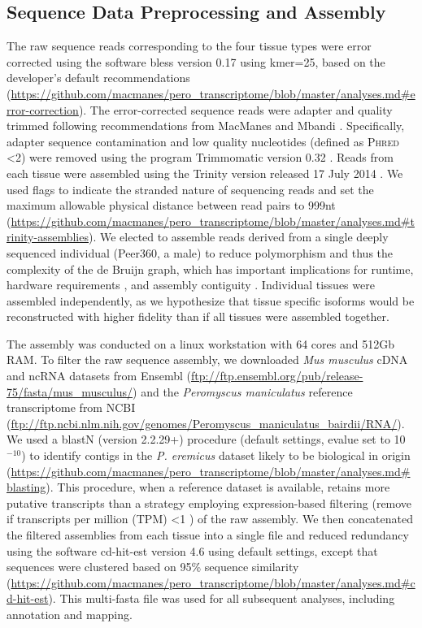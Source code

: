 \documentclass[12pt]{article}
\begin{document}
\subsection*{Sequence Data Preprocessing and Assembly}

The raw sequence reads corresponding to the four tissue types were error corrected using the software bless version 0.17 \citep{Heo:2014cb} using kmer=25, based on the developer's default recommendations (\url{https://github.com/macmanes/pero_transcriptome/blob/master/analyses.md#error-correction}). The error-corrected sequence reads were adapter and quality trimmed following recommendations from MacManes \citep{MacManes:2014io} and Mbandi \citep{Christoffels:2014bg}. Specifically, adapter sequence contamination and low quality nucleotides (defined as \textsc{Phred} \textless 2) were removed using the program Trimmomatic version 0.32  \citep{Bolger:2014ek}. Reads from each tissue were assembled using the Trinity version released 17 July 2014 \citep{Haas:2013jq}. We used flags to indicate the stranded nature of sequencing reads and set the maximum allowable physical distance between read pairs to 999nt (\url{https://github.com/macmanes/pero_transcriptome/blob/master/analyses.md#trinity-assemblies}). We elected to assemble reads derived from a single deeply sequenced individual (Peer360, a male) to reduce polymorphism and thus the complexity of the de Bruijn graph, which has important implications for runtime, hardware requirements \citep{Lowe:2014iv,Pop:2009dp}, and assembly contiguity \citep{Vijay:2012gy}. Individual tissues were assembled independently, as we hypothesize that tissue specific isoforms would be reconstructed with higher fidelity than if all tissues were assembled together. 


The assembly was conducted on a linux workstation with 64 cores and 512Gb RAM. To filter the raw sequence assembly, we downloaded \textit{Mus musculus} cDNA and ncRNA datasets from Ensembl (\url{ftp://ftp.ensembl.org/pub/release-75/fasta/mus_musculus/}) and the \textit{Peromyscus maniculatus} reference transcriptome from NCBI (\url{ftp://ftp.ncbi.nlm.nih.gov/genomes/Peromyscus_maniculatus_bairdii/RNA/}). We used a blastN (version 2.2.29+) procedure (default settings, evalue set to 10$^{-10}$) to identify contigs in the \textit{P. eremicus} dataset likely to be biological in origin (\url{https://github.com/macmanes/pero_transcriptome/blob/master/analyses.md#blasting}). This procedure, when a reference dataset is available, retains more putative transcripts than a strategy employing expression-based filtering (remove if transcripts per million (TPM) \textless 1  \citep{MacManes:2012bu}) of the raw assembly. We then concatenated the filtered assemblies from each tissue into a single file and reduced redundancy using the software cd-hit-est version 4.6 \citep{Li:2006hr} using default settings, except that sequences were clustered based on 95\% sequence similarity (\url{https://github.com/macmanes/pero_transcriptome/blob/master/analyses.md#cd-hit-est}). This multi-fasta file was used for all subsequent analyses, including annotation and mapping. \\
\end{document}

